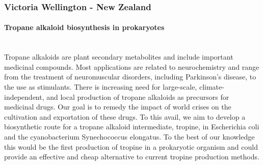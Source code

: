 \subsubsection*{Victoria Wellington - New Zealand}
\paragraph{Tropane alkaloid biosynthesis in prokaryotes}\mbox{} \\
Tropane alkaloids are plant secondary metabolites and include important medicinal compounds. Most applications are related to neurochemistry and range from the treatment of neuromuscular disorders, including Parkinson’s disease, to the use as stimulants. There is increasing need for large-scale, climate-independent, and local production of tropane alkaloids as precursors for medicinal drugs. Our goal is to remedy the impact of world crises on the cultivation and exportation of these drugs. To this avail, we aim to develop a biosynthetic route for a tropane alkaloid intermediate, tropine, in Escherichia coli and the cyanobacterium Synechococcus elongatus. To the best of our knowledge this would be the first production of tropine in a prokaryotic organism and could provide an effective and cheap alternative to current tropine production methods.

\pagebreak
